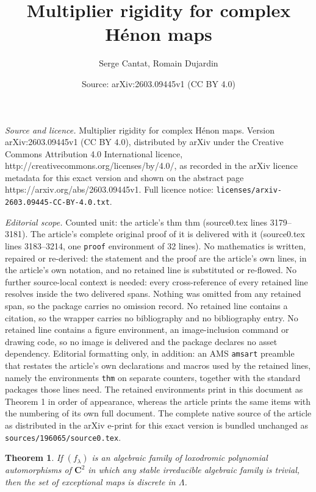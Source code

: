 \documentclass[10pt,a4paper]{amsart}
\title{Multiplier rigidity for complex Hénon maps}
\author{Serge Cantat, Romain Dujardin}
\date{Source: arXiv:2603.09445v1 (CC BY 4.0)}
\newtheorem{thm}{Theorem}
\newcommand{\C}{\mathbf{C}}
\begin{document}
\maketitle

\noindent\emph{Source and licence.} Multiplier rigidity for complex Hénon maps. Version arXiv:2603.09445v1 (CC BY 4.0), distributed by arXiv under the Creative Commons Attribution 4.0 International licence, http://creativecommons.org/licenses/by/4.0/, as recorded in the arXiv licence metadata for this exact version and shown on the abstract page https://arxiv.org/abs/2603.09445v1. Full licence notice: \texttt{licenses/arxiv-2603.09445-CC-BY-4.0.txt}.\par\smallskip

\noindent\textit{Editorial scope.} Counted unit: the article's thm thm (source0.tex lines 3179--3181). The article's complete original proof of it is delivered with it (source0.tex lines 3183--3214, one \texttt{proof} environment of 32 lines). No mathematics is written, repaired or re-derived: the statement and the proof are the article's own lines, in the article's own notation, and no retained line is substituted or re-flowed.  No further source-local context is needed: every cross-reference of every retained line resolves inside the two delivered spans.  Nothing was omitted from any retained span, so the package carries no omission record.  No retained line contains a citation, so the wrapper carries no bibliography and no bibliography entry.  No retained line contains a figure environment, an image-inclusion command or drawing code, so no image is delivered and the package declares no asset dependency.  Editorial formatting only, in addition: an AMS \texttt{amsart} preamble that restates the article's own declarations and macros used by the retained lines, namely the environments \texttt{thm} on separate counters, together with the standard packages those lines need.  The retained environments print in this document as Theorem 1 in order of appearance, whereas the article prints the same items with the numbering of its own full document.  The complete native source of the article as distributed in the arXiv e-print for this exact version is bundled unchanged as \texttt{sources/196065/source0.tex}.
\begin{thm}
If $(f_\lambda)$ is an algebraic family of loxodromic polynomial automorphisms of $\C^2$ in which any stable irreducible algebraic family is trivial, then the set of exceptional maps is discrete in $\Lambda$. 
\end{thm}
\end{document}

